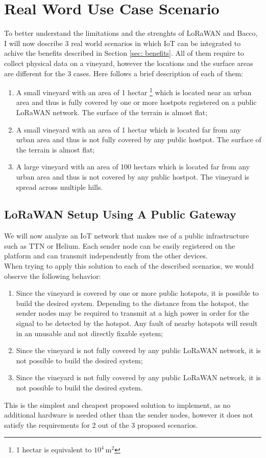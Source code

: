 \section{Real Word Use Case Scenario}
To better understand the limitations and the strenghts of LoRaWAN and Bacco, I will now describe 3 real world scenarios
in which \gls{IoT} can be integrated to achive the benefits described in Section \ref{sec: benefits}. All of them
require to collect physical data on a vineyard, however the locations and the surface areas are different for the 3
cases. Here follows a brief description of each of them:

\begin{enumerate}
    \item A small vineyard with an area of 1 hectar \footnote{1 hectar is equivalent to $10^4~\mathrm{m^2}$} which is
        located near an urban area and thus is fully covered by one or more hostpots registered on a public LoRaWAN
        network. The surface of the terrain is almost flat;
    \item A small vineyard with an area of 1 hectar which is located far from any urban area and thus is not fully
        covered by any public hostpot. The surface of the terrain is almost flat;
    \item A large vineyard with an area of 100 hectars which is located far from any urban area and thus is not covered
        by any public hostpot. The vineyard is spread across multiple hills.
\end{enumerate}

\subsection{LoRaWAN Setup Using A Public Gateway}
We will now analyze an \gls{IoT} network that makes use of a public infrastructure such as
\gls{TTN} or Helium. Each sender node can be easily registered on the platform and can transmit independently from the
other devices.\\
When trying to apply this solution to each of the described scenarios, we would observe the following behavior:
\begin{enumerate}
    \item Since the vineyard is covered by one or more public hotspots, it is possible to build the desired system.
        Depending to the distance from the hotspot, the sender nodes may be required to transmit at a high power in
        order for the signal to be detected by the hotspot. Any fault of nearby hotspots will result in an unusable and
        not directly fixable system;
    \item Since the vineyard is not fully covered by any public LoRaWAN network, it is not possible to build the desired
        system;
    \item Since the vineyard is not fully covered by any public LoRaWAN network, it is not possible to build the desired
        system.
\end{enumerate}
This is the simplest and cheapest proposed solution to implement, as no additional hardware is needed other than the
sender nodes, however it does not satisfy the requirements for 2 out of the 3 proposed scenarios.

